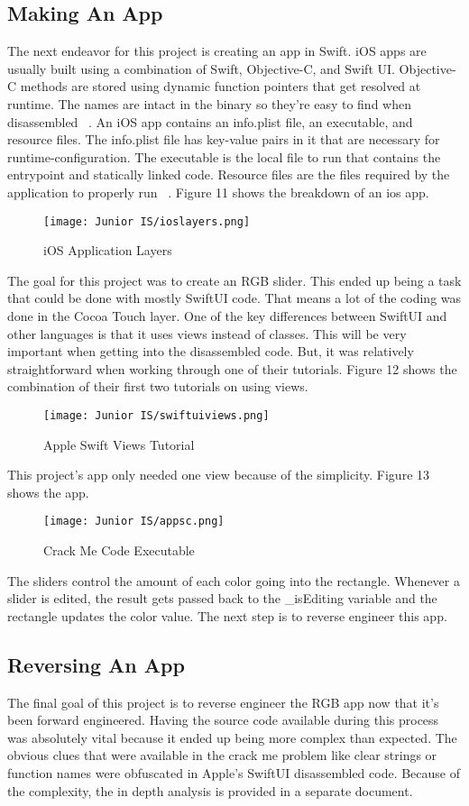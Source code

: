 \documentclass[12pt]{article}
\begin{document}
\subsection{Making An App}
The next endeavor for this project is creating an app in Swift. iOS apps are usually built using a combination of Swift, Objective-C, and Swift UI. Objective-C methods are stored using dynamic function pointers that get resolved at runtime. The names are intact in the binary so they’re easy to find when disassembled ~\cite{mobileRe}. An iOS app contains an info.plist file, an executable, and resource files. The info.plist file has key-value pairs in it that are necessary for runtime-configuration. The executable is the local file to run that contains the entrypoint and statically linked code. Resource files are the files required by the application to properly run ~\cite{mobileRe}. Figure 11 shows the breakdown of an ios app.
\begin{figure}[hbt!]
\caption{iOS Application Layers}
\texttt{[image: Junior IS/ioslayers.png]}
\end{figure}
The goal for this project was to create an RGB slider. This ended up being a task that could be done with mostly SwiftUI code. That means a lot of the coding was done in the Cocoa Touch layer. One of the key differences between SwiftUI and other languages is that it uses views instead of classes. This will be very important when getting into the disassembled code. But, it was relatively straightforward when working through one of their tutorials. Figure 12 shows the combination of their first two tutorials on using views.
\begin{figure}[h!]
\caption{Apple Swift Views Tutorial}
\texttt{[image: Junior IS/swiftuiviews.png]}
\end{figure}
This project’s app only needed one view because of the simplicity. Figure 13 shows the app.
\begin{figure}[h!]
\caption{Crack Me Code Executable}
\texttt{[image: Junior IS/appsc.png]}
\end{figure}
The sliders control the amount of each color going into the rectangle. Whenever a slider is edited, the result gets passed back to the \_isEditing variable and the rectangle updates the color value. The next step is to reverse engineer this app.

\clearpage
\subsection{Reversing An App}
The final goal of this project is to reverse engineer the RGB app now that it’s been forward engineered. Having the source code available during this process was absolutely vital because it ended up being more complex than expected. The obvious clues that were available in the crack me problem like clear strings or function names were obfuscated in Apple’s SwiftUI disassembled code. Because of the complexity, the in depth analysis is provided in a separate document.  
\end{document}
